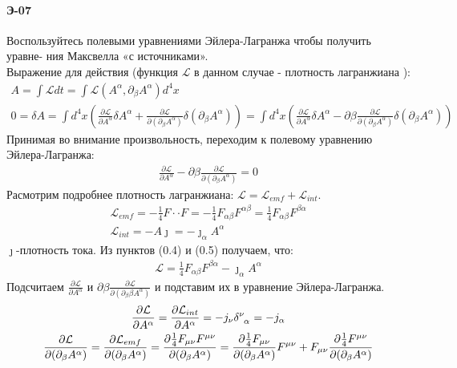 \documentclass[__main__.tex]{subfiles}
\begin{document}
	\paragraph{Э-07}
Воспользуйтесь полевыми уравнениями Эйлера-Лагранжа чтобы получить уравне-
ния Максвелла «с источниками».\\
	
	Выражение для действия (функция $\mathcal{L}$ в данном случае - плотность лагранжиана ): 
	\begin{gather}
		A=\int \mathcal{L}dt=\int \mathcal{L}( A^{\alpha},\partial_\beta  A^{\alpha})d^4x\\
		0=\delta A=
		\int d^4x\left(
		\frac{\partial \mathcal{L}}{\partial A^\alpha}\delta A^\alpha+\frac{\partial  \mathcal{L}}{\partial(\partial_\beta A^\alpha)}\delta(\partial_\beta A^\alpha)\right)=
		\int d^4x(\frac{\partial \mathcal{L}}{\partial  A^\alpha}\delta A^\alpha-\partial\beta\frac{\partial  \mathcal{L}}{\partial(\partial_\beta A^\alpha)}\delta(\partial_\beta A^\alpha)) 
	\end{gather}
	Принимая во внимание произвольность, переходим к полевому уравнению Эйлера-Лагранжа: \\
	\begin{gather}
		\frac{\partial \mathcal{L}}{\partial  A^\alpha}-\partial\beta\frac{\partial  \mathcal{L}}{\partial(\partial_\beta A^\alpha)}=0
	\end{gather}
	Расмотрим подробнее плотность лагранжиана: $ \mathcal{L} = \mathcal{L}_{emf}+ \mathcal{L}_{int}.$\\
	\begin{gather}
		\mathcal{L}_{emf}=-\frac{1}{4}F\cdot\cdot F=-\frac{1}{4}F_{\alpha\beta}F^{\alpha\beta}=\frac{1}{4}F_{\alpha\beta}F^{\beta\alpha}\\
		\mathcal{L}_{int}=- A\jmath=-\jmath_\alpha A^\alpha
	\end{gather}
	$\jmath$-плотность тока. Из пунктов (0.4) и (0.5) получаем, что:
	\begin{gather}
		\mathcal{L}=\frac{1}{4}F_{\alpha\beta}F^{\beta\alpha}-\jmath_\alpha A^\alpha
	\end{gather}
	Подсчитаем $\frac{\partial \mathcal{L}}{\partial  A^\alpha}$ и $\partial\beta\frac{\partial  \mathcal{L}}{\partial(\partial_\beta\beta A^\alpha)}$ и подставим их в уравнение Эйлера-Лагранжа.
	\begin{gather}
		\frac{\partial \mathcal{L}}{\partial A^\alpha}=
		\frac{\partial \mathcal{L}_{int}}{\partial  A^\alpha}=
		-j_\nu\delta\indices{^\nu_\alpha} = -j_\alpha\\
		\frac{\partial  \mathcal{L}}{\partial(\partial_\beta A^\alpha)}=\frac{\partial  \mathcal{L}_{emf}}{\partial(\partial_\beta A^\alpha)}=
		\frac{\partial\frac{1}{4}F_{\mu\nu}F^{\mu\nu}}{\partial(\partial_\beta A^\alpha)} =
		\frac{\partial\frac{1}{4}F_{\mu\nu}}{\partial(\partial_\beta A^\alpha)}F^{\mu\nu}+F_{\mu\nu}\frac{\partial\frac{1}{4}F^{\mu\nu}}{\partial(\partial_\beta A^\alpha)}
	\end{gather}
\end{document}
